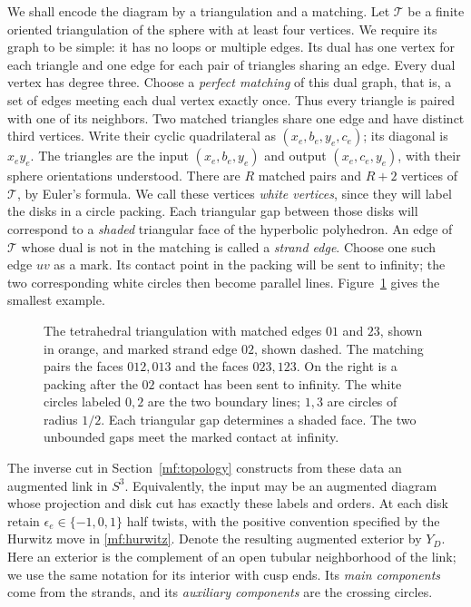 \documentclass[11pt]{article}
\numberwithin{equation}{section}
\theoremstyle{definition}
\theoremstyle{remark}
\begin{document}
We shall encode the diagram by a triangulation and a matching.
Let \(\mathcal T\) be a finite oriented triangulation of the sphere
with at least four vertices. We require its graph to be simple: it has
no loops or multiple edges. Its dual has one vertex for each triangle
and one edge for each pair of triangles sharing an edge. Every dual
vertex has degree three. Choose a \emph{perfect matching} of this dual
graph, that is, a set of edges meeting each dual vertex exactly once.
Thus every triangle is paired with one of its neighbors.
Two matched triangles share one edge and have distinct third vertices.
Write their cyclic quadrilateral as
\((x_e,b_e,y_e,c_e)\); its diagonal is \(x_ey_e\).
The triangles are the input \((x_e,b_e,y_e)\) and output
\((x_e,c_e,y_e)\), with their sphere orientations understood.
There are \(R\) matched pairs and \(R+2\) vertices of
\(\mathcal T\), by Euler's formula. We call these vertices
\emph{white vertices}, since they will label the disks in a circle
packing. Each triangular gap between those disks will correspond to
a \emph{shaded} triangular face of the hyperbolic polyhedron. An edge
of \(\mathcal T\) whose dual is not in the matching is called a
\emph{strand edge}. Choose one such edge \(uv\) as a mark. Its
contact point in the packing will be sent to infinity; the two
corresponding white circles then become parallel lines.
Figure~\ref{mf:input-example} gives the smallest example.

\begin{figure}[ht]
\centering
\caption{The tetrahedral triangulation with matched edges $01$ and
$23$, shown in orange, and marked strand edge $02$, shown dashed.
The matching pairs the faces $012,013$ and the faces $023,123$.
On the right is a packing after the $02$ contact has been sent to
infinity. The white circles labeled $0,2$ are the two boundary lines;
$1,3$ are circles of radius $1/2$. Each triangular gap determines a
shaded face. The two unbounded gaps meet the marked contact at infinity.}
\label{mf:input-example}
\end{figure}

The inverse cut in Section~\ref{mf:topology} constructs from these data
an augmented link in \(S^3\). Equivalently, the input may be an
augmented diagram whose projection and disk cut has exactly these
labels and orders. At each disk retain
\(\epsilon_e\in\{-1,0,1\}\) half twists, with the positive convention
specified by the Hurwitz move in \eqref{mf:hurwitz}. Denote the resulting
augmented exterior by \(Y_D\). Here an exterior is the complement
of an open tubular neighborhood of the link; we use the same notation
for its interior with cusp ends. Its \emph{main components} come from
the strands, and its \emph{auxiliary components} are the crossing circles.
\end{document}
